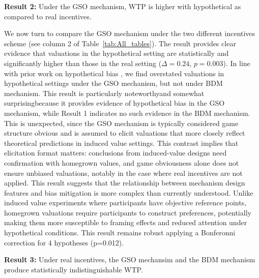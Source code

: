 \documentclass[12pt]{article}
\begin{document}
\textbf{Result 2:} Under the GSO mechanism, WTP is higher with hypothetical as compared to real incentives. 

We now turn to compare the GSO mechanism under the two different incentives scheme (see column 2 of Table~\ref{tab:All_tables}). The result provides clear evidence that valuations in the hypothetical setting are statistically and significantly higher than those in the real setting (\(\Delta = 0.24\), \(p =0.003\)). 
In line with prior work on hypothetical bias \citep{penn2018understanding, fang_use_2021, ahles_testing_2024}, we find overstated valuations in hypothetical settings under the GSO mechanism, but not under BDM mechanism.  
This result is particularly noteworthy\textemdash and somewhat surprising\textemdash because it provides evidence of hypothetical bias in the GSO mechanism, while Result 1 indicates no such evidence in the BDM mechanism. This is unexpected, since the GSO mechanism is typically considered  game structure obvious  and is assumed to elicit valuations that more closely reflect theoretical predictions in induced value settings. This contrast implies that elicitation format matters: conclusions from induced-value designs need confirmation with homegrown values, and game obviousness alone does not ensure unbiased valuations, notably in the case where real incentives are not applied. This result suggests that the relationship between mechanism design features and bias mitigation is more complex than currently understood. Unlike induced value experiments where participants have objective reference points, homegrown valuations require participants to construct preferences, potentially making them more susceptible to framing effects and reduced attention under hypothetical conditions. This result remains robust applying a Bonferonni correction for 4 hypotheses (p=0.012).




\vspace{0.5cm}



\textbf{Result 3:} Under real incentives, the GSO mechansim and the BDM mechanism produce statistically indistinguishable WTP. 
\end{document}
